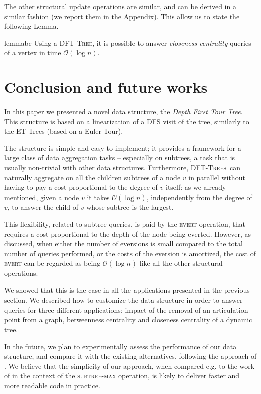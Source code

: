\documentclass[a4paper,USenglish]{lipics}
\newcommand{\bigoh}{\mathcal{O}}
\newcommand{\dft}{\textsc{DFT-Tree}}
\newcommand{\dfts}{\textsc{DFT-Trees}}
\begin{document}
The other structural update operations are similar, and can be derived in a similar fashion (we report them in the Appendix). This allow us to state the following Lemma.
\begin{restatable}{lemma}{bc}
Using a \dft, it is possible to answer \emph{closeness centrality} queries of a vertex in time $\bigoh (\log n)$.
\end{restatable}


\section{Conclusion and future works}
\label{sec:conclusion}


In this paper we presented a novel data structure, the \emph{Depth First Tour Tree}. This structure is based on a linearization of a DFS visit of the tree, similarly to the ET-Trees (based on a Euler Tour). 

The structure is simple and easy to implement; it provides a framework for a large class of data aggregation tasks -- especially on subtrees, a task that is usually non-trivial with other data structures. 
Furthermore, \dfts\ can naturally aggregate on all the children subtrees of a node $v$ in parallel without having to pay a cost proportional to the degree of $v$ itself: as we already mentioned, given a node $v$ it takes $\bigoh(\log n)$, independently from the degree of $v$, to answer the child of $v$ whose subtree is the largest.

This flexibility, related to subtree queries, is paid by the \textsc{evert} operation, that requires a cost proportional to the depth of the node being everted. However, as discussed, when either the number of eversions is small compared to the total number of queries performed, or the costs of the eversion is amortized, the cost of \textsc{evert} can be regarded as being $\bigoh(\log n)$ like all the other structural operations. 

We showed that this is the case in all the applications presented in the previous section. We described how to customize the data structure in order to answer queries for three different applications: impact of the removal of an articulation point from a graph, betweenness centrality and closeness centrality of a dynamic tree. 

In the future, we plan to experimentally assess the performance of our data structure, and compare it with the existing alternatives, following the approach of \cite{TW09}. We believe that the simplicity of our approach, when compared e.g. to the work of \cite{Radzik98implementationof} in the context of the \textsc{subtree-max} operation, is likely to deliver faster and more readable code in practice.
\end{document}
